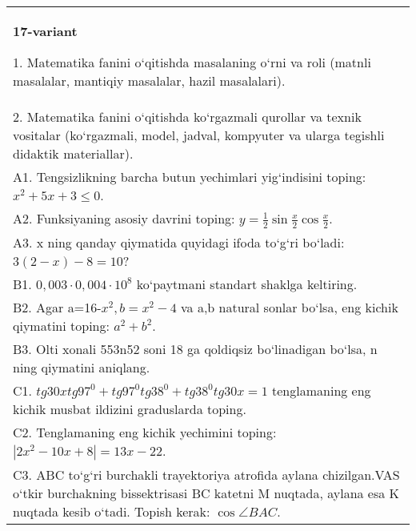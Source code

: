 \documentclass{article}
\begin{document}
\begin{tabular}{m{17cm}}
\textbf{17-variant}

1. Matematika fanini o‘qitishda masalaning o‘rni va roli (matnli masalalar, mantiqiy masalalar, hazil masalalari). \\
2. Matematika fanini o‘qitishda ko‘rgazmali qurollar va texnik vositalar (ko‘rgazmali, model, jadval, kompyuter va ularga tegishli didaktik materiallar). \\
A1. Tengsizlikning barcha butun yechimlari yig‘indisini toping: \(x^2 + 5x + 3 \leq 0\). \\
A2. Funksiyaning asosiy davrini toping: \(y = \frac{1}{2}\sin{\frac{x}{2}\cos\frac{x}{2}}\). \\
A3. x ning qanday qiymatida quyidagi ifoda to‘g‘ri bo‘ladi: \(3 (2 - x) - 8 = 10\)? \\
B1. \(0,003 \cdot 0,004 \cdot 10^{8}\) ko‘paytmani standart shaklga keltiring. \\
B2. Agar a=16-\(x^2, b=x^2-4\) va a,b natural sonlar bo‘lsa, eng kichik qiymatini toping: \(a^2 + b^2\). \\
B3. Olti xonali 553n52 soni 18 ga qoldiqsiz bo‘linadigan bo‘lsa, n ning qiymatini aniqlang. \\
C1. \(tg30xtg97^{0} + tg97^{0}tg38^{0} + tg38^{0}tg30x = 1\) tenglamaning eng kichik musbat ildizini graduslarda toping. \\
C2. Tenglamaning eng kichik yechimini toping: \(\left| 2x^2 - 10x + 8 \right| = 13x - 22\). \\
C3. ABC to‘g‘ri burchakli trayektoriya atrofida aylana chizilgan.VAS o‘tkir burchakning bissektrisasi BC katetni M nuqtada, aylana esa K nuqtada kesib o‘tadi. Topish kerak: \(\cos\angle BAC\). \\

\end{tabular}
\vspace{1cm}
\end{document}
